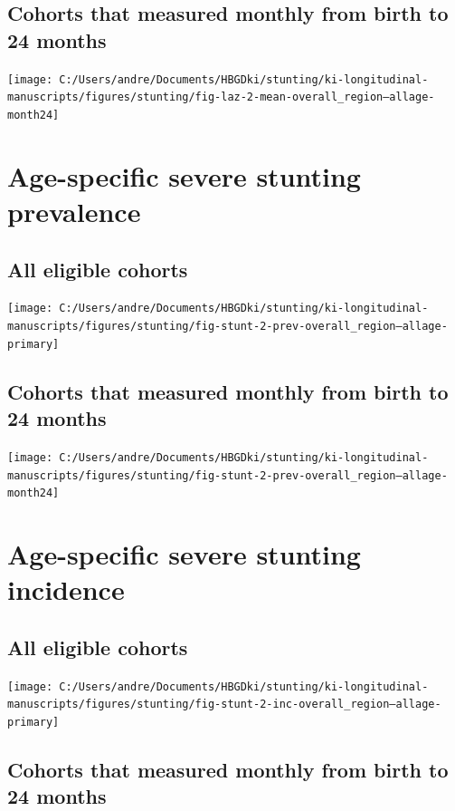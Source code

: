 \documentclass[9pt,]{book}
\begin{document}
\subsection{Cohorts that measured monthly from birth to 24
months}\label{cohorts-that-measured-monthly-from-birth-to-24-months}

\texttt{[image: C:/Users/andre/Documents/HBGDki/stunting/ki-longitudinal-manuscripts/figures/stunting/fig-laz-2-mean-overall\_region--allage-month24]}

\section{Age-specific severe stunting
prevalence}\label{age-specific-severe-stunting-prevalence-1}

\subsection{All eligible cohorts}\label{all-eligible-cohorts-1}

\texttt{[image: C:/Users/andre/Documents/HBGDki/stunting/ki-longitudinal-manuscripts/figures/stunting/fig-stunt-2-prev-overall\_region--allage-primary]}

\subsection{Cohorts that measured monthly from birth to 24
months}\label{cohorts-that-measured-monthly-from-birth-to-24-months-1}

\texttt{[image: C:/Users/andre/Documents/HBGDki/stunting/ki-longitudinal-manuscripts/figures/stunting/fig-stunt-2-prev-overall\_region--allage-month24]}

\section{Age-specific severe stunting
incidence}\label{age-specific-severe-stunting-incidence-1}

\subsection{All eligible cohorts}\label{all-eligible-cohorts-2}

\texttt{[image: C:/Users/andre/Documents/HBGDki/stunting/ki-longitudinal-manuscripts/figures/stunting/fig-stunt-2-inc-overall\_region--allage-primary]}

\subsection{Cohorts that measured monthly from birth to 24
months}\label{cohorts-that-measured-monthly-from-birth-to-24-months-2}
\end{document}
